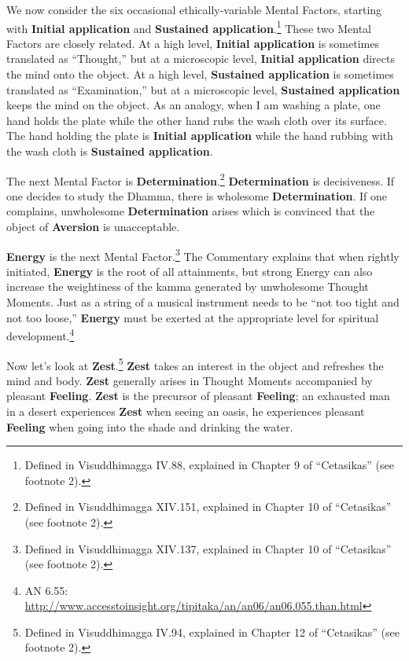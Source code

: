 We now consider the six occasional ethically-variable Mental Factors, starting with \textbf{Initial application} and \textbf{Sustained application}.\footnote{Defined in Visuddhimagga IV.88, explained in Chapter 9 of “Cetasikas” (see footnote 2).} These two Mental Factors are closely related. At a high level, \textbf{Initial application} is sometimes translated as “Thought,” but at a microscopic level, \textbf{Initial application} directs the mind onto the object. At a high level, \textbf{Sustained application} is sometimes translated as “Examination,” but at a microscopic level, \textbf{Sustained application} keeps the mind on the object. As an analogy, when I am washing a plate, one hand holds the plate while the other hand rubs the wash cloth over its surface. The hand holding the plate is \textbf{Initial application} while the hand rubbing with the wash cloth is \textbf{Sustained application}.

The next Mental Factor is \textbf{Determination}.\footnote{Defined in Visuddhimagga XIV.151, explained in Chapter 10 of “Cetasikas” (see footnote 2).} \textbf{Determination} is decisiveness. If one decides to study the Dhamma, there is wholesome \textbf{Determination}. If one complains, unwholesome \textbf{Determination} arises which is convinced that the object of \textbf{Aversion} is unacceptable.

\textbf{Energy} is the next Mental Factor.\footnote{Defined in Visuddhimagga XIV.137, explained in Chapter 10 of “Cetasikas” (see footnote 2).} The Commentary explains that when rightly initiated, \textbf{Energy} is the root of all attainments, but strong Energy can also increase the weightiness of the kamma generated by unwholesome Thought Moments. Just as a string of a musical instrument needs to be “not too tight and not too loose,” \textbf{Energy} must be exerted at the appropriate level for spiritual development.\footnote{AN 6.55: \url{http://www.accesstoinsight.org/tipitaka/an/an06/an06.055.than.html}}

Now let’s look at \textbf{Zest}.\footnote{Defined in Visuddhimagga IV.94, explained in Chapter 12 of “Cetasikas” (see footnote 2).} \textbf{Zest} takes an interest in the object and refreshes the mind and body. \textbf{Zest} generally arises in Thought Moments accompanied by pleasant \textbf{Feeling}. \textbf{Zest} is the precursor of pleasant \textbf{Feeling}; an exhausted man in a desert experiences \textbf{Zest} when seeing an oasis, he experiences pleasant \textbf{Feeling} when going into the shade and drinking the water.


